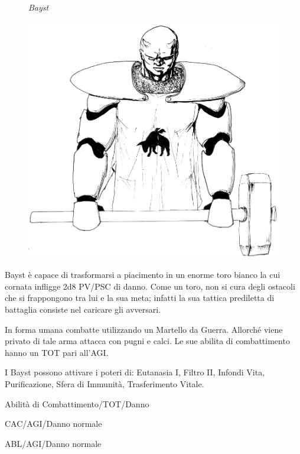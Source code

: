 \begin{figure}[t]
\begin{center}
{\it Bayst}\par\bigskip
\includegraphics{baystbig.eps}
\end{center}
\end{figure}

Bayst \`e capace di trasformarsi a piacimento in un enorme toro
bianco la cui cornata infligge 2d8 PV/PSC di danno. Come un toro, non
si cura degli ostacoli che si frappongono tra lui e la sua meta;
infatti la sua tattica prediletta di battaglia consiste nel caricare
gli avversari.

In forma umana combatte utilizzando un Martello da Guerra.
Allorch\'e viene privato di tale arma attacca con pugni e calci. Le
sue abilita di combattimento hanno un TOT pari all'AGI.

I Bayst possono attivare i poteri di: Eutanasia I, Filtro II, Infondi
Vita, Purificazione, Sfera di Immunit\`a, Trasferimento Vitale. 


\begin{parmostro}{Abilit\`a di Combattimento/TOT/Danno}
\item CAC/AGI/Danno normale
\item ABL/AGI/Danno normale
\end{parmostro}

